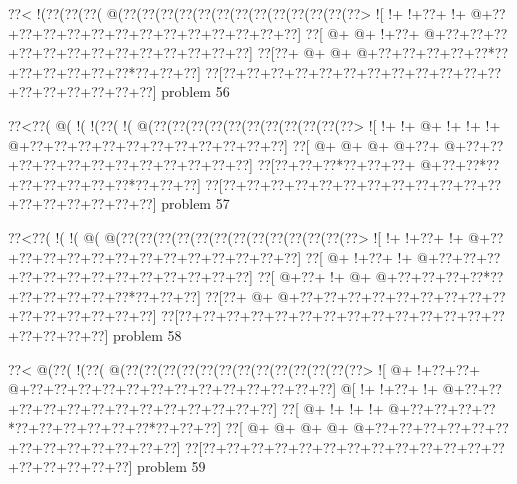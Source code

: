 \vbox{\vbox{\goo
\0??<\- !(\0??(\0??(\0??(\- @(\0??(\0??(\0??(\0??(\0??(\0??(\0??(\0??(\0??(\0??(\0??(\0??(\0??>
\- ![\- !+\- !+\0??+\- !+\- @+\0??+\0??+\0??+\0??+\0??+\0??+\0??+\0??+\0??+\0??+\0??+\0??+\0??]
\0??[\- @+\- @+\- !+\0??+\- @+\0??+\0??+\0??+\0??+\0??+\0??+\0??+\0??+\0??+\0??+\0??+\0??+\0??]
\0??[\0??+\- @+\- @+\- @+\0??+\0??+\0??+\0??+\0??*\0??+\0??+\0??+\0??+\0??+\0??*\0??+\0??+\0??]
\0??[\0??+\0??+\0??+\0??+\0??+\0??+\0??+\0??+\0??+\0??+\0??+\0??+\0??+\0??+\0??+\0??+\0??+\0??]
}
\hfil problem 56\hfil\break
}



\vbox{\vbox{\goo
\0??<\0??(\- @(\- !(\- !(\0??(\- !(\- @(\0??(\0??(\0??(\0??(\0??(\0??(\0??(\0??(\0??(\0??(\0??>
\- ![\- !+\- !+\- @+\- !+\- !+\- !+\- @+\0??+\0??+\0??+\0??+\0??+\0??+\0??+\0??+\0??+\0??+\0??]
\0??[\- @+\- @+\- @+\- @+\0??+\- @+\0??+\0??+\0??+\0??+\0??+\0??+\0??+\0??+\0??+\0??+\0??+\0??]
\0??[\0??+\0??+\0??*\0??+\0??+\0??+\- @+\0??+\0??*\0??+\0??+\0??+\0??+\0??+\0??*\0??+\0??+\0??]
\0??[\0??+\0??+\0??+\0??+\0??+\0??+\0??+\0??+\0??+\0??+\0??+\0??+\0??+\0??+\0??+\0??+\0??+\0??]
}
\hfil problem 57\hfil\break
}



\vbox{\vbox{\goo
\0??<\0??(\- !(\- !(\- @(\- @(\0??(\0??(\0??(\0??(\0??(\0??(\0??(\0??(\0??(\0??(\0??(\0??(\0??>
\- ![\- !+\- !+\0??+\- !+\- @+\0??+\0??+\0??+\0??+\0??+\0??+\0??+\0??+\0??+\0??+\0??+\0??+\0??]
\0??[\- @+\- !+\0??+\- !+\- @+\0??+\0??+\0??+\0??+\0??+\0??+\0??+\0??+\0??+\0??+\0??+\0??+\0??]
\0??[\- @+\0??+\- !+\- @+\- @+\0??+\0??+\0??+\0??*\0??+\0??+\0??+\0??+\0??+\0??*\0??+\0??+\0??]
\0??[\0??+\- @+\- @+\0??+\0??+\0??+\0??+\0??+\0??+\0??+\0??+\0??+\0??+\0??+\0??+\0??+\0??+\0??]
\0??[\0??+\0??+\0??+\0??+\0??+\0??+\0??+\0??+\0??+\0??+\0??+\0??+\0??+\0??+\0??+\0??+\0??+\0??]
}
\hfil problem 58\hfil\break
}



\vbox{\vbox{\goo
\0??<\- @(\0??(\- !(\0??(\- @(\0??(\0??(\0??(\0??(\0??(\0??(\0??(\0??(\0??(\0??(\0??(\0??(\0??>
\- ![\- @+\- !+\0??+\0??+\- @+\0??+\0??+\0??+\0??+\0??+\0??+\0??+\0??+\0??+\0??+\0??+\0??+\0??]
\- @[\- !+\- !+\0??+\- !+\- @+\0??+\0??+\0??+\0??+\0??+\0??+\0??+\0??+\0??+\0??+\0??+\0??+\0??]
\0??[\- @+\- !+\- !+\- !+\- @+\0??+\0??+\0??+\0??*\0??+\0??+\0??+\0??+\0??+\0??*\0??+\0??+\0??]
\0??[\- @+\- @+\- @+\- @+\- @+\0??+\0??+\0??+\0??+\0??+\0??+\0??+\0??+\0??+\0??+\0??+\0??+\0??]
\0??[\0??+\0??+\0??+\0??+\0??+\0??+\0??+\0??+\0??+\0??+\0??+\0??+\0??+\0??+\0??+\0??+\0??+\0??]
}
\hfil problem 59\hfil\break
}



